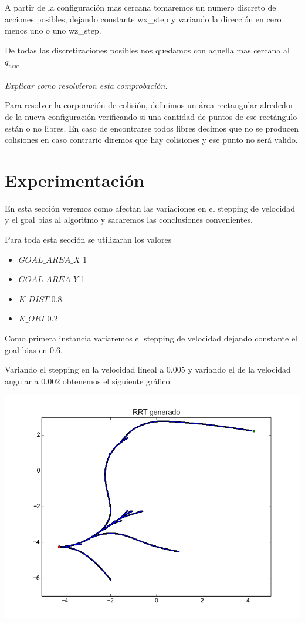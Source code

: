 A partir de la configuración mas cercana tomaremos un numero discreto de acciones posibles, dejando constante wx\_step y variando la dirección en cero menos uno o uno wz\_step.

De todas las discretizaciones posibles nos quedamos con aquella mas cercana al $q_{new}$
\\
\\
\textit{Explicar como resolvieron esta comprobación.}

Para resolver la corporación de colisión, definimos un área rectangular alrededor de la nueva configuración verificando si una cantidad de puntos de ese rectángulo están o no libres. En caso de encontrarse todos libres decimos que no se producen colisiones en caso contrario diremos que hay colisiones y ese punto no será valido.

\section{Experimentación}

En esta sección veremos como afectan las variaciones en el stepping de velocidad y el goal bias al algoritmo y sacaremos las conclusiones convenientes.

Para toda esta sección se utilizaran los valores

\begin{itemize}
\item $GOAL\_AREA\_X$ 1
\item $GOAL\_AREA\_Y$ 1
\item $K\_DIST$ 0.8
\item $K\_ORI$ 0.2
\end{itemize}

Como primera instancia variaremos el stepping de velocidad dejando constante el goal bias en $0.6$.

Variando el stepping en la velocidad lineal a $0.005$ y variando el de la velocidad angular a $0.002$ obtenemos el siguiente gráfico:



\includegraphics[scale=0.5]{velocidad/stepping_Bajo1.png}

